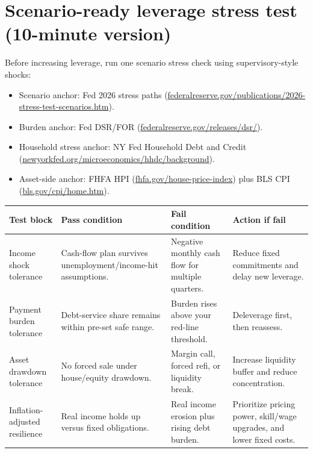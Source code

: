 \documentclass[11pt,openany]{book}
\begin{document}
\section{Scenario-ready leverage stress test (10-minute version)}

Before increasing leverage, run one scenario stress check using supervisory-style shocks:

\begin{itemize}
  \item Scenario anchor: Fed 2026 stress paths (\url{federalreserve.gov/publications/2026-stress-test-scenarios.htm}).
  \item Burden anchor: Fed DSR/FOR (\url{federalreserve.gov/releases/dsr/}).
  \item Household stress anchor: NY Fed Household Debt and Credit (\url{newyorkfed.org/microeconomics/hhdc/background}).
  \item Asset-side anchor: FHFA HPI (\url{fhfa.gov/house-price-index}) plus BLS CPI (\url{bls.gov/cpi/home.htm}).
\end{itemize}

\begin{center}
\small
\begin{tabularx}{\textwidth}{>{\raggedright\arraybackslash}p{}>{\raggedright\arraybackslash}p{}>{\raggedright\arraybackslash}p{}X}
\toprule
\textbf{Test block} & \textbf{Pass condition} & \textbf{Fail condition} & \textbf{Action if fail} \\
\midrule
Income shock tolerance & Cash-flow plan survives unemployment/income-hit assumptions. & Negative monthly cash flow for multiple quarters. & Reduce fixed commitments and delay new leverage. \\
Payment burden tolerance & Debt-service share remains within pre-set safe range. & Burden rises above your red-line threshold. & Deleverage first, then reassess. \\
Asset drawdown tolerance & No forced sale under house/equity drawdown. & Margin call, forced refi, or liquidity break. & Increase liquidity buffer and reduce concentration. \\
Inflation-adjusted resilience & Real income holds up versus fixed obligations. & Real income erosion plus rising debt burden. & Prioritize pricing power, skill/wage upgrades, and lower fixed costs. \\
\bottomrule
\end{tabularx}
\normalsize
\end{center}
\end{document}
